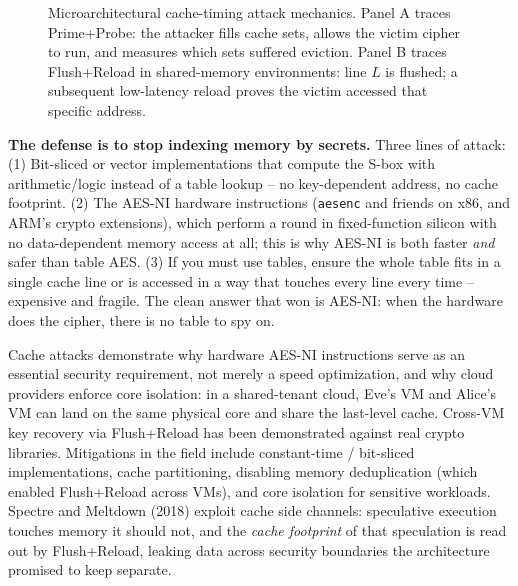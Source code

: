 \begin{figure}[H]
\caption{Microarchitectural cache-timing attack mechanics. Panel A traces Prime+Probe: the attacker fills cache sets, allows the victim cipher to run, and measures which sets suffered eviction. Panel B traces Flush+Reload in shared-memory environments: line $L$ is flushed; a subsequent low-latency reload proves the victim accessed that specific address.}
\label{ch37:fig-cache-attacks}
\end{figure}


\begin{whybox}
\textbf{The defense is to stop indexing memory by secrets.} Three lines of attack: (1) Bit-sliced or vector implementations that compute the S-box with arithmetic/logic instead of a table lookup -- no key-dependent address, no cache footprint. (2) The AES-NI hardware instructions (\texttt{aesenc} and friends on x86, and ARM's crypto extensions), which perform a round in fixed-function silicon with no data-dependent memory access at all; this is why AES-NI is both faster \emph{and} safer than table AES. (3) If you must use tables, ensure the whole table fits in a single cache line or is accessed in a way that touches every line every time -- expensive and fragile. The clean answer that won is AES-NI: when the hardware does the cipher, there is no table to spy on.
\end{whybox}

\begin{applicationbox}
Cache attacks demonstrate why hardware AES-NI instructions serve as an essential security requirement, not merely a speed optimization, and why cloud providers enforce core isolation: in a shared-tenant cloud, Eve's VM and Alice's VM can land on the same physical core and share the last-level cache. Cross-VM key recovery via Flush+Reload has been demonstrated against real crypto libraries. Mitigations in the field include constant-time / bit-sliced implementations, cache partitioning, disabling memory deduplication (which enabled Flush+Reload across VMs), and core isolation for sensitive workloads. Spectre and Meltdown (2018) exploit cache side channels: speculative execution touches memory it should not, and the \emph{cache footprint} of that speculation is read out by Flush+Reload, leaking data across security boundaries the architecture promised to keep separate.
\end{applicationbox}

